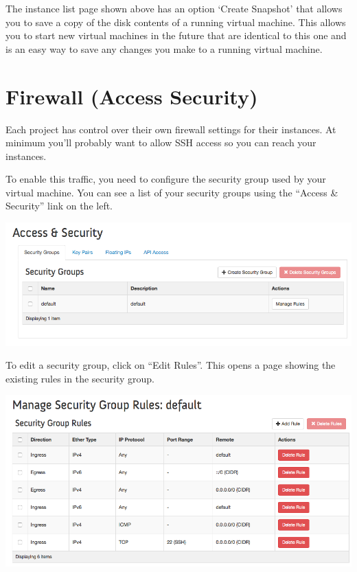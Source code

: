 The instance list page shown above has an option `Create Snapshot' that
allows you to save a copy of the disk contents of a running virtual
machine. This allows you to start new virtual machines in the future
that are identical to this one and is an easy way to save any changes
you make to a running virtual machine.

\section{Firewall (Access Security)}\label{firewall-access-security}

Each project has control over their own firewall settings for their
instances. At minimum you'll probably want to allow SSH access so you
can reach your instances.

To enable this traffic, you need to configure the security group used by
your virtual machine. You can see a list of your security groups using
the ``Access \& Security'' link on the left.

\includegraphics[width=\columnwidth]{images/chameleon/openstack_alamo_security_groups.png}

To edit a security group, click on ``Edit Rules''. This opens a page
showing the existing rules in the security group.

\includegraphics[width=\columnwidth]{images/chameleon/openstack_alamo_edit_rules.png}

